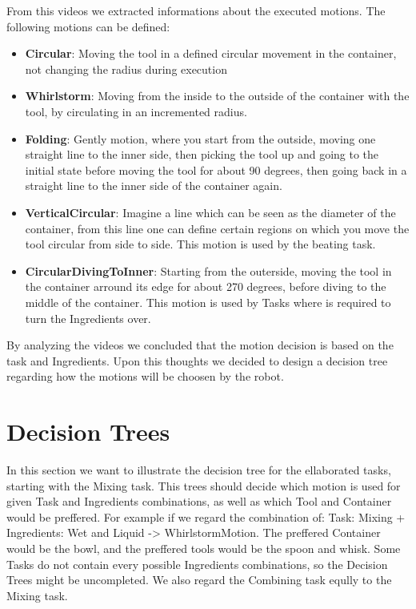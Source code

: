 	From this videos we extracted informations about the executed motions. The following motions can be defined:
	\begin{itemize}
		\item \textbf{Circular}: Moving the tool in a defined circular movement in the container, not changing the radius during execution
		\item \textbf{Whirlstorm}: Moving from the inside to the outside of the container with the tool, by circulating in an incremented radius.
		\item \textbf{Folding}: Gently motion, where you start from the outside, moving one straight line to the inner side, then picking the tool up and going to the initial state before moving the tool for about 90 degrees, then going back in a straight line to the inner side of the container again.
		\item \textbf{VerticalCircular}: Imagine a line which can be seen as the diameter of the container, from this line one can define certain regions on which you move the tool circular from side to side. This motion is used by the beating task.
		\item \textbf{CircularDivingToInner}: Starting from the outerside, moving the tool in the container arround its edge for about 270 degrees, before diving to the middle of the container. This motion is used by Tasks where is required to turn the Ingredients over.
	\end{itemize}

	By analyzing the videos we concluded that the motion decision is based on the task and Ingredients. Upon this thoughts we decided to design a decision tree regarding how the motions will be choosen by the robot.
\newpage
\section*{Decision Trees}
In this section we want to illustrate the decision tree for the ellaborated tasks, starting with the Mixing task.
This trees should decide which motion is used for given Task and Ingredients combinations, as well as which Tool and Container would be preffered.
For example if we regard the combination of: \newline Task: Mixing + Ingredients: Wet and Liquid -> WhirlstormMotion. The preffered Container would be the bowl, and the preffered tools would be the spoon and whisk.
Some Tasks do not contain every possible Ingredients combinations, so the Decision Trees might be uncompleted. We also regard the Combining task eqully to the Mixing task.

